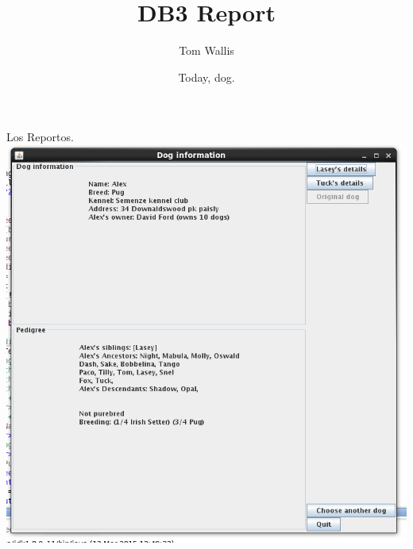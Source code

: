 \documentclass{report}
\title{DB3 Report}
\author{Tom Wallis}
\date{Today, dog.}
\begin{document}
\maketitle

Los Reportos.
\includegraphics{Working-so-far-Thurs-13:49.png}
\end{document}
